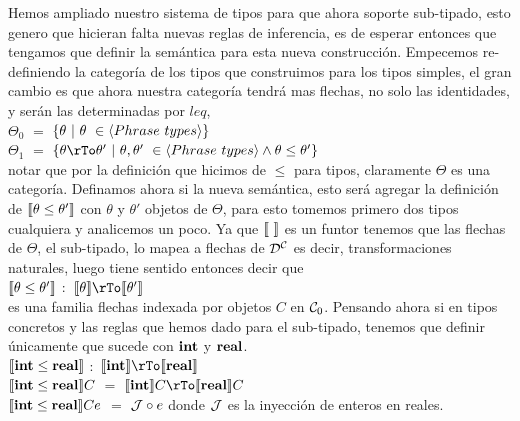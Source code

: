 Hemos ampliado nuestro sistema de tipos para que ahora soporte sub-tipado, 
esto genero que hicieran falta nuevas reglas de inferencia, es de esperar
entonces que tengamos que definir la sem\'antica para esta nueva construcci\'on.
Empecemos re-definiendo la categor\'ia de los tipos que construimos para los
tipos simples, el gran cambio es que ahora nuestra categor\'ia tendr\'a mas
flechas, no solo las identidades, y ser\'an las determinadas por $leq$,\\

\noindent $\Theta_0$ $=$ $\{\theta \ | \ \theta \ \in \langle Phrase \ types \rangle \}$\\
$\Theta_1$ $=$ $\{\theta \rTo \theta' \ | \ \theta,\theta' \ \in \lrangles{Phrase \ types} \wedge \theta \leq \theta' \}$\\

\noindent
notar que por la definici\'on que hicimos de $\leq$ para tipos, claramente 
$\Theta$ es una categor\'ia. Definamos ahora si la nueva sem\'antica, esto 
ser\'a agregar la definici\'on de $\llbracket \theta \leq \theta' \rrbracket$ con
$\theta$ y $\theta'$ objetos de $\Theta$, para esto tomemos primero dos 
tipos cualquiera y analicemos un poco. Ya que $\llbracket  \  \rrbracket$ es un funtor
tenemos que las flechas de $\Theta$, el sub-tipado, lo mapea a flechas de ${\mathcal{D}}^{\mathcal{C}}$
es decir, transformaciones naturales, luego tiene sentido entonces decir que\\

\noindent
$\llbracket \theta \leq \theta' \rrbracket$ $:$ $\semBrcks{\theta} \rTo \semBrcks{\theta'}$\\

\noindent
es una familia flechas indexada por objetos $C$ en $\mathcal{C}_0$. Pensando ahora si en
tipos concretos y las reglas que hemos dado para el sub-tipado, tenemos que definir
\'unicamente que sucede con $\textbf{int}$ y $\textbf{real}$.\\

\noindent
$\llbracket \textbf{int} \leq \textbf{real} \rrbracket$ $:$ $\semBrcks{\intt} \rTo \semBrcks{\realt}$\\
$\llbracket \textbf{int} \leq \textbf{real} \rrbracket C$ $=$ $\semBrcks{\intt}C \rTo \semBrcks{\realt}C$\\
$\llbracket \textbf{int} \leq \textbf{real} \rrbracket Ce$ $=$ $\mathcal{J} \circ e$ donde $\mathcal{J}$ es la inyecci\'on de enteros en reales.




